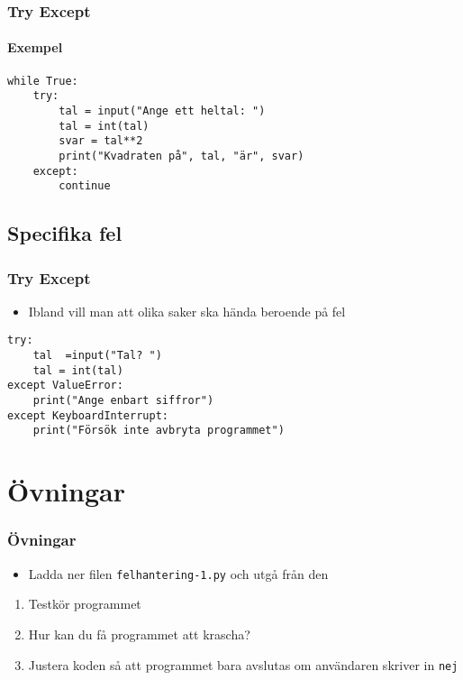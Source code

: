 \documentclass[aspectratio=169]{beamer}
\begin{document}
\begin{frame}[fragile]
	\frametitle{Try Except}
	\framesubtitle{Exempel}
	
	\begin{lstlisting}
while True:
    try:
        tal = input("Ange ett heltal: ")
        tal = int(tal)
        svar = tal**2
        print("Kvadraten på", tal, "är", svar)
    except:
        continue
	\end{lstlisting}
	
\end{frame}

\subsection{Specifika fel}

\begin{frame}[fragile]
	\frametitle{Try Except}
	
	\begin{itemize}
		\item Ibland vill man att olika saker ska hända beroende på fel
	\end{itemize}
	
	\begin{lstlisting}
try:
    tal  =input("Tal? ")
    tal = int(tal)
except ValueError:
    print("Ange enbart siffror")
except KeyboardInterrupt:
    print("Försök inte avbryta programmet")
	\end{lstlisting}

\end{frame}

\section{Övningar}

\begin{frame}
	\frametitle{Övningar}
	
	\begin{itemize}
		\item Ladda ner filen \texttt{felhantering-1.py} och utgå från den
	\end{itemize}
	
	\begin{enumerate}
		\item Testkör programmet
		\item Hur kan du få programmet att krascha?
		\item Justera koden så att programmet bara avslutas om användaren skriver in \texttt{nej}
	\end{enumerate}
	
\end{frame}
\end{document}
